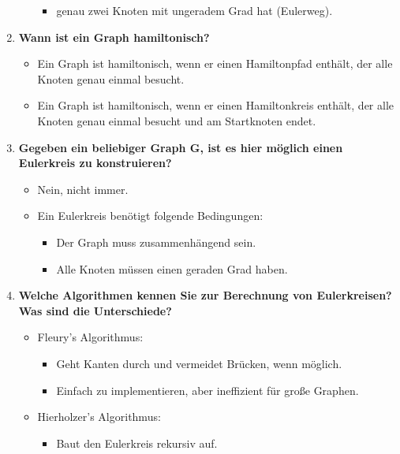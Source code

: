 \documentclass[12pt]{scrartcl}
\begin{document}
\begin{enumerate}
\begin{itemize}
\begin{itemize}
                        \item genau zwei Knoten mit ungeradem Grad hat (Eulerweg).
                    \end{itemize}
          \end{itemize}
    \item \textbf{Wann ist ein Graph hamiltonisch?}
          \begin{itemize}
              \item Ein Graph ist hamiltonisch, wenn er einen Hamiltonpfad enthält, der alle Knoten genau einmal besucht.
              \item Ein Graph ist hamiltonisch, wenn er einen Hamiltonkreis enthält, der alle Knoten genau einmal besucht und am Startknoten endet.
          \end{itemize}
    \item \textbf{Gegeben ein beliebiger Graph G, ist es hier möglich einen Eulerkreis zu konstruieren?}
          \begin{itemize}
              \item Nein, nicht immer.
              \item Ein Eulerkreis benötigt folgende Bedingungen:
                    \begin{itemize}
                        \item Der Graph muss zusammenhängend sein.
                        \item Alle Knoten müssen einen geraden Grad haben.
                    \end{itemize}
          \end{itemize}
    \item \textbf{Welche Algorithmen kennen Sie zur Berechnung von Eulerkreisen? Was sind die Unterschiede?}
          \begin{itemize}
              \item Fleury's Algorithmus:
                    \begin{itemize}
                        \item Geht Kanten durch und vermeidet Brücken, wenn möglich.
                        \item Einfach zu implementieren, aber ineffizient für große Graphen.
                    \end{itemize}
              \item Hierholzer's Algorithmus:
                    \begin{itemize}
                        \item Baut den Eulerkreis rekursiv auf.

\end{itemize}
\end{itemize}
\end{enumerate}
\end{document}
